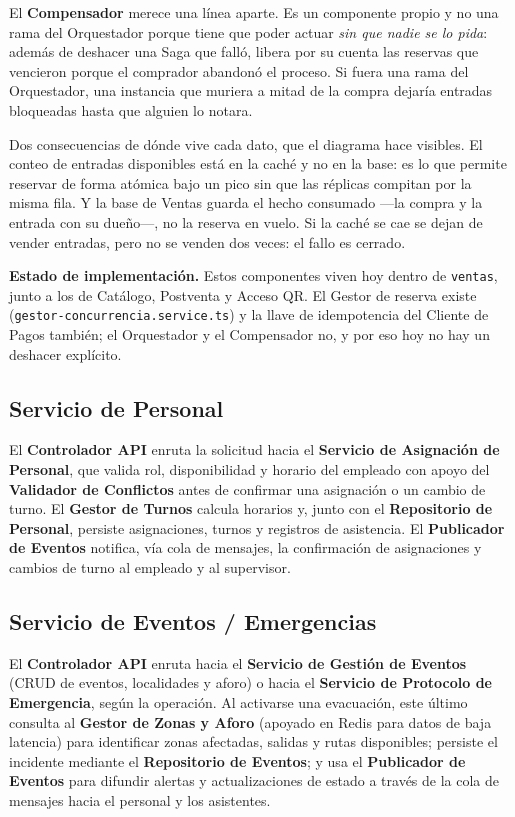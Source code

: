 El \textbf{Compensador} merece una línea aparte. Es un componente propio y no una rama del
Orquestador porque tiene que poder actuar \emph{sin que nadie se lo pida}: además de deshacer una
Saga que falló, libera por su cuenta las reservas que vencieron porque el comprador abandonó el
proceso. Si fuera una rama del Orquestador, una instancia que muriera a mitad de la compra dejaría
entradas bloqueadas hasta que alguien lo notara.

\medskip
\noindent Dos consecuencias de dónde vive cada dato, que el diagrama hace visibles. El conteo de
entradas disponibles está en la caché y no en la base: es lo que permite reservar de forma atómica
bajo un pico sin que las réplicas compitan por la misma fila. Y la base de Ventas guarda el hecho
consumado —la compra y la entrada con su dueño—, no la reserva en vuelo. Si la caché se cae se
dejan de vender entradas, pero no se venden dos veces: el fallo es cerrado.

\medskip
\noindent\textbf{Estado de implementación.} Estos componentes viven hoy dentro de
\texttt{ventas}, junto a los de Catálogo, Postventa y Acceso QR. El Gestor de
reserva existe (\texttt{gestor-concurrencia.service.ts}) y la llave de idempotencia del Cliente de
Pagos también; el Orquestador y el Compensador no, y por eso hoy no hay un deshacer explícito.

\subsection{Servicio de Personal}

El \textbf{Controlador API} enruta la solicitud hacia el \textbf{Servicio de Asignación de
Personal}, que valida rol, disponibilidad y horario del empleado con apoyo del \textbf{Validador
de Conflictos} antes de confirmar una asignación o un cambio de turno. El \textbf{Gestor de
Turnos} calcula horarios y, junto con el \textbf{Repositorio de Personal}, persiste asignaciones,
turnos y registros de asistencia. El \textbf{Publicador de Eventos} notifica, vía cola de
mensajes, la confirmación de asignaciones y cambios de turno al empleado y al supervisor.

\subsection{Servicio de Eventos / Emergencias}

El \textbf{Controlador API} enruta hacia el \textbf{Servicio de Gestión de Eventos} (CRUD de
eventos, localidades y aforo) o hacia el \textbf{Servicio de Protocolo de Emergencia}, según la
operación. Al activarse una evacuación, este último consulta al \textbf{Gestor de Zonas y Aforo}
(apoyado en Redis para datos de baja latencia) para identificar zonas afectadas, salidas y rutas
disponibles; persiste el incidente mediante el \textbf{Repositorio de Eventos}; y usa el
\textbf{Publicador de Eventos} para difundir alertas y actualizaciones de estado a través de la
cola de mensajes hacia el personal y los asistentes.

